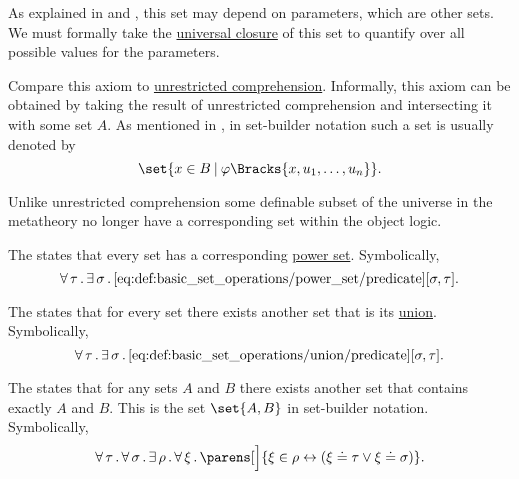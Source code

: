 \begin{definition}
\begin{thmenum}
    As explained in  and , this set may depend on parameters, which are other sets. We must formally take the \hyperref[thm:implicit_universal_quantification]{universal closure} of this set to quantify over all possible values for the parameters.

    Compare this axiom to \hyperref[def:naive_set_theory/unrestricted_comprehension]{unrestricted comprehension}. Informally, this axiom can be obtained by taking the result of unrestricted comprehension and intersecting it with some set \( A \). As mentioned in , in set-builder notation such a set is usually denoted by
    \begin{equation*}
      \set{ x \in B \given \varphi\Bracks{x, u_1, \ldots, u_n} }.
    \end{equation*}

    Unlike unrestricted comprehension some definable subset of the universe in the metatheory no longer have a corresponding set within the object logic.

     The  states that every set has a corresponding \hyperref[def:basic_set_operations/power_set]{power set}. Symbolically,
    \begin{equation}\label{eq:def:zfc/power_set}
      \forall \thinspace \tau \thinspace . \thinspace \exists \thinspace \sigma \thinspace . \thinspace \ref{eq:def:basic_set_operations/power_set/predicate}[\sigma, \tau].
    \end{equation}

     The  states that for every set there exists another set that is its \hyperref[def:basic_set_operations/union]{union}. Symbolically,
    \begin{equation}\label{eq:def:zfc/union}
      \forall \thinspace \tau \thinspace . \thinspace \exists \thinspace \sigma \thinspace . \thinspace \ref{eq:def:basic_set_operations/union/predicate}[\sigma, \tau].
    \end{equation}

     The  states that for any sets \( A \) and \( B \) there exists another set that contains exactly \( A \) and \( B \). This is the set \( \set{ A, B } \) in set-builder notation. Symbolically,
    \begin{equation}\label{eq:def:zfc/pairing}
      \qforall \tau \qforall \sigma \qexists \rho \qforall \xi \parens[\Big]{ \xi \in \rho \leftrightarrow ( \xi \doteq \tau \vee \xi \doteq \sigma) }.
    \end{equation}


\end{thmenum}
\end{definition}
